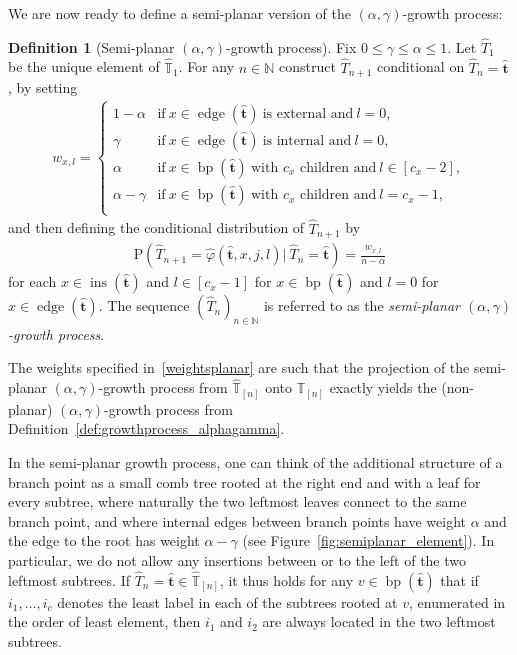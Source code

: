 \documentclass[a4paper, final]{amsart}
\theoremstyle{plain}
\theoremstyle{definition}
\newtheorem{defi}[thm]{Definition}
\newcommand{\tree}[1][t]{\boldsymbol{#1}}
\newcommand{\that}[1][t]{\hat{\boldsymbol{#1}}} %
\newcommand{\That}[1][T]{\widehat{#1}}
\newcommand{\Thatspace}[1][\T]{\widehat{\boldsymbol{#1}}} %
\newcommand{\T}{\mathbb{T}}
\DeclareMathOperator{\edge}{edge}
\DeclareMathOperator{\insertable}{ins}
\DeclareMathOperator{\branchpoints}{bp}
\newcommand{\nin}{{n \in \mathbb{N}}}
\renewcommand{\P}{\mathrm{P}}
\begin{document}
  We are now ready to define a semi-planar version of the $(\alpha, \gamma)$-growth process:
%
\begin{defi}[Semi-planar $(\alpha, \gamma)$-growth process]\label{def:planaralphagamma}
  Fix $0 \leq \gamma \leq \alpha \leq 1$.
  Let $\That_1$ be the unique element of $\Thatspace_1$.
  For any $\nin$ construct $\That_{n+1}$ conditional on $\That_n = \that$, by setting 
    \begin{align}
        w_{x, l}
        =
        \begin{cases}
          1 - \alpha & \text{if}\ x \in \edge ( \that )\ \text{is external and}\ l = 0, \\
          \gamma & \text{if}\ x \in \edge ( \that )\ \text{is internal and}\ l = 0, \\
          \alpha & \text{if}\ x \in \branchpoints( \that )\ \text{with $c_x$ children and}\ l \in [c_x-2], \\
          \alpha - \gamma & \text{if}\ x \in \branchpoints( \that )\ \text{with $c_x$ children and}\ l = c_x-1, \\
        \end{cases}
        \label{weightsplanar}
    \end{align}
    and then defining the conditional distribution of $\That_{n+1}$ by
    \begin{align}
        \P \left( \That_{n+1} = \hat{\varphi} \left( \hat{\tree}, x, j, l \right) \Big| \ \That_n = \hat{\tree} \right)
        = \frac{w_{x,l}}{n - \alpha}
        \label{InsertionPlanarAlphaGamma}
    \end{align}
    for each $x \in \insertable \left( \that \right)$ and $l \in [c_x - 1]$ for $x \in \branchpoints (\that)$ and $l=0$ for $x \in \edge (\that)$.
    The sequence ${\left( \That_n \right)}_\nin$ is referred to as the \textit{semi-planar $(\alpha, \gamma)$-growth process}.
\end{defi}
%
The weights specified in~\eqref{weightsplanar} are such that the projection of the semi-planar $(\alpha, \gamma)$-growth process from $\Thatspace_{[n]}$ onto $\T_{[n]}$ exactly yields the (non-planar) $(\alpha, \gamma)$-growth process from Definition~\ref{def:growthprocess_alphagamma}.

In the semi-planar growth process, one can think of the additional structure of a branch point as a small comb tree rooted at the right end and with a leaf for every subtree, where naturally the two leftmost leaves connect to the same branch point, and where internal edges between branch points have weight $\alpha$ and the edge to the root has weight $\alpha - \gamma$ (see Figure~\ref{fig:semiplanar_element}).
In particular, we do not allow any insertions between or to the left of the two leftmost subtrees.
If $\That_n = \that \in \Thatspace_{[n]}$, it thus holds for any $v \in \branchpoints(\that)$ that if $i_1, \ldots, i_c$ denotes the least label in each of the subtrees rooted at $v$, enumerated in the order of least element, then $i_1$ and $i_2$ are always located in the two leftmost subtrees.
\end{document}
